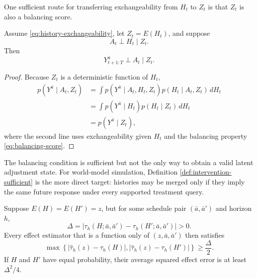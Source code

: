 One sufficient route for transferring exchangeability from $H_t$ to
$Z_t$ is that $Z_t$ is also a balancing score.

\begin{proposition}
\label{prop:exchangeability-transfer}
Assume \eqref{eq:history-exchangeability}, let $Z_t=E(H_t)$, and suppose
\begin{equation}
    A_t\perp H_t\mid Z_t.
    \label{eq:balancing-score}
\end{equation}
Then
\begin{equation}
    Y_{t+1:T}^{\bar a}\perp A_t\mid Z_t.
    \label{eq:latent-exchangeability}
\end{equation}
\end{proposition}

\begin{proof}
Because $Z_t$ is a deterministic function of $H_t$,
\begin{align}
p(Y^{\bar a}\mid A_t,Z_t)
&=\int p(Y^{\bar a}\mid A_t,H_t,Z_t)
          p(H_t\mid A_t,Z_t)\,dH_t\\
&=\int p(Y^{\bar a}\mid H_t)
          p(H_t\mid Z_t)\,dH_t\\
&=p(Y^{\bar a}\mid Z_t),
\end{align}
where the second line uses exchangeability given $H_t$ and the balancing
property \eqref{eq:balancing-score}.
\end{proof}

The balancing condition is sufficient but not the only way to obtain a
valid latent adjustment state. For world-model simulation, Definition
\ref{def:intervention-sufficient} is the more direct target: histories
may be merged only if they imply the same future response under every
supported treatment query.

\begin{proposition}
\label{prop:aliasing-lower-bound}
Suppose $E(H)=E(H')=z$, but for some schedule pair
$(\bar a,\bar a')$ and horizon $h$,
\begin{equation}
    \Delta=
    \left|
    \tau_h(H;\bar a,\bar a')
    -\tau_h(H';\bar a,\bar a')
    \right|>0.
    \label{eq:aliased-effect-gap}
\end{equation}
Every effect estimator that is a function only of
$(z,\bar a,\bar a')$ then satisfies
\begin{equation}
    \max\!\left\{
    |\widehat\tau_h(z)-\tau_h(H)|,
    |\widehat\tau_h(z)-\tau_h(H')|
    \right\}
    \geq \frac{\Delta}{2}.
    \label{eq:aliasing-max-error}
\end{equation}
If $H$ and $H'$ have equal probability, their average squared effect
error is at least $\Delta^2/4$.
\end{proposition}

